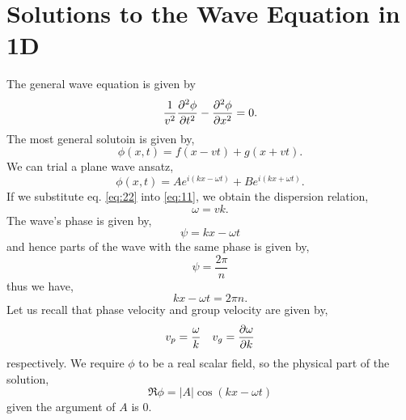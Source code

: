\documentclass{book}
\begin{document}
\section{Solutions to the Wave Equation in 1D}
The general wave equation is given by
\begin{equation}
	\frac{1}{v^2}\pdv[2]{\phi}{t} - \pdv[2]{\phi}{x} = 0. \label{eq:11}
\end{equation}
The most general solutoin is given by,
\begin{equation}
	\phi(x,t) = f(x-vt) + g(x + vt).
\end{equation}
We can trial a plane wave ansatz,
\begin{equation}
	\phi(x,t) = Ae^{i(kx-\omega t)} + Be^{i(kx +\omega t)}. \label{eq:22}
\end{equation}
If we substitute eq. \eqref{eq:22} into \eqref{eq:11}, we obtain the dispersion relation,
\begin{equation}
	\omega = vk.
\end{equation}
The wave's phase is given by,
\begin{equation}
	\psi = kx - \omega t
\end{equation}
and hence parts of the wave with the same phase is given by,
\begin{equation}
	\psi = \frac{2\pi}{n}
\end{equation}
thus we have,
\begin{equation}
	kx - \omega t = 2\pi n. 
\end{equation}
Let us recall that phase velocity and group velocity are given by,
\begin{align}
	v_p = \frac{\omega}{k} && v_g = \pdv{\omega}{k}
\end{align}
respectively. We require $\phi$ to be a real scalar field, so the physical part of the solution,
\begin{equation}
	\Re{\phi} = |A|\cos(kx - \omega t)
\end{equation}
given the argument of $A$ is 0. 
\end{document}
